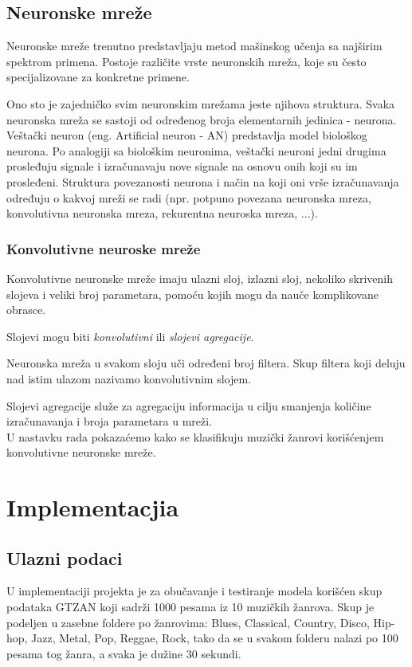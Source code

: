 \documentclass{article}
\begin{document}
\subsection{Neuronske mreže}
Neuronske mreže trenutno predstavljaju metod mašinskog učenja sa najširim spektrom primena. Postoje različite vrste neuronskih mreža, koje su često specijalizovane za konkretne primene. 

Ono sto je zajedničko svim neuronskim mrežama jeste njihova struktura. Svaka neuronska mreža se sastoji od određenog broja elementarnih jedinica - neurona. Veštački neuron (eng. Artificial neuron - AN) predstavlja model biološkog neurona. Po analogiji sa biološkim neuronima, veštački neuroni jedni drugima prosleđuju
signale i izračunavaju nove signale na osnovu onih koji su im prosleđeni. Struktura povezanosti neurona
i način na koji oni vrše izračunavanja određuju o kakvoj mreži se
radi (npr. potpuno povezana neuronska mreza, konvolutivna neuronska mreza, rekurentna neuroska mreza, ...).

\subsubsection{Konvolutivne neuroske mreže}
Konvolutivne neuronske mreže imaju ulazni sloj, izlazni sloj, nekoliko skrivenih slojeva i veliki broj parametara, pomoću kojih mogu da nauče komplikovane obrasce.

Slojevi mogu biti \emph{konvolutivni} ili \emph{slojevi agregacije}. 

Neuronska mreža u svakom sloju uči određeni broj filtera. Skup filtera koji deluju nad istim ulazom nazivamo konvolutivnim slojem.

Slojevi agregacije služe za agregaciju informacija u cilju smanjenja količine izračunavanja i broja parametara u mreži.
\\

U nastavku rada pokazaćemo kako se klasifikuju muzički žanrovi korišćenjem konvolutivne neuronske mreže.

\newpage 

\section{Implementacjia}

\subsection{Ulazni podaci}
U implementaciji projekta je za obučavanje i testiranje modela korišćen skup podataka GTZAN koji sadrži 1000 pesama iz 10 muzičkih žanrova. Skup je podeljen u zasebne foldere po žanrovima: Blues, Classical, Country, Disco, Hip-hop, Jazz, Metal, Pop, Reggae, Rock, tako da se u svakom folderu nalazi po 100 pesama tog žanra, a svaka je dužine 30 sekundi. 
\end{document}
